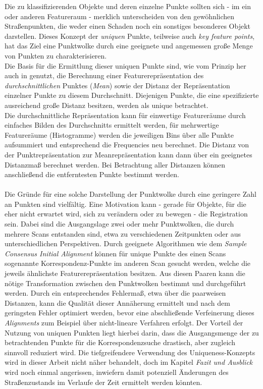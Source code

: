 Die zu klassifizierenden Objekte und deren einzelne Punkte sollten sich - im ein oder anderen Featureraum - merklich unterscheiden von den gewöhnlichen Straßenpunkten, die weder einen Schaden noch ein sonstiges besonderes Objekt darstellen. Dieses Konzept der \textit{uniquen} Punkte, teilweise auch \textit{key feature points}, hat das Ziel eine Punktwolke durch eine geeignete und angemessen große Menge von Punkten zu charakterisieren. \\
Die Basis für die Ermittlung dieser uniquen Punkte sind, wie vom Prinzip her auch in \cite{Rusu.etal-2008} genutzt, die Berechnung einer Featurerepräsentation des \textit{durchschnittlichen} Punktes (\textit{Mean}) sowie der Distanz der Repräsentation einzelner Punkte zu diesem Durchschnitt. Diejenigen Punkte, die eine spezifizierte ausreichend große Distanz besitzen, werden als unique betrachtet. \\
Die durchschnittliche Repräsentation kann für einwertige Featureräume durch einfaches Bilden des Durchschnitts ermittelt werden, für mehrwertige Featureräume (Histogramme) werden die jeweiligen Bins über alle Punkte aufsummiert und entsprechend die Frequencies neu berechnet. Die Distanz von der Punktrepräsentation zur Meanrepräsentation kann dann über ein geeignetes Distanzmaß berechnet werden. Bei Betrachtung aller Distanzen können anschließend die entferntesten Punkte bestimmt werden. \\\\
Die Gründe für eine solche Darstellung der Punktwolke durch eine geringere Zahl an Punkten sind vielfältig. Eine Motivation kann - gerade für Objekte, für die eher nicht erwartet wird, sich zu verändern oder zu bewegen - die Registration sein. Dabei sind die Ausgangslage zwei oder mehr Punktwolken, die durch mehrere Scans entstanden sind, etwa zu verschiedenen Zeitpunkten oder aus unterschiedlichen Perspektiven. Durch geeignete Algorithmen wie dem \textit{Sample Consensus Initial Alignment} \citep{Rusu.etal-2009} können für unique Punkte des einen Scans sogenannte Korrespondenz-Punkte im anderen Scan gesucht werden, welche die jeweils ähnlichste Featurerepräsentation besitzen. Aus diesen Paaren kann die nötige Transformation zwischen den Punktwolken bestimmt und durchgeführt werden. Durch ein entsprechendes Fehlermaß, etwa über die paarweisen Distanzen, kann die Qualität dieser Annäherung ermittelt und nach dem geringsten Fehler optimiert werden, bevor eine abschließende Verfeinerung dieses \textit{Alignments} zum Beispiel über nicht-lineare Verfahren erfolgt. Der Vorteil der Nutzung von uniquen Punkten liegt hierbei darin, dass die Ausgangsmenge der zu betrachtenden Punkte für die Korrespondenzsuche drastisch, aber zugleich sinnvoll reduziert wird. Die tiefgreifendere Verwendung des Uniqueness-Konzepts wird in dieser Arbeit nicht näher behandelt, doch im Kapitel \textit{Fazit und Ausblick} wird noch einmal angerissen, inwiefern damit potenziell Änderungen des Straßenzustands im Verlaufe der Zeit ermittelt werden könnten. \\
